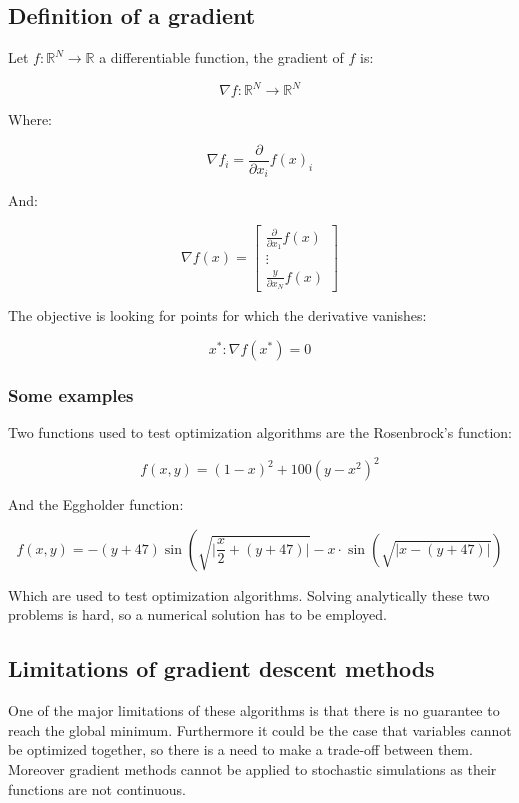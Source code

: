   \subsection{Definition of a gradient}
  Let $f: \mathbb{R}^N \rightarrow \mathbb{R}$ a differentiable function, the gradient of $f$ is:

  $$\nabla f: \mathbb{R}^N \rightarrow \mathbb{R}^N$$

  Where:

  $$\nabla f_i=\frac{\partial}{\partial x_i} f(x)_i$$

  And:

  $$\nabla f(x) =\left[\begin{array}{c}\frac{\partial}{\partial x_1} f(x) \\ \vdots \\ \frac{y}{\partial x_N} f(x)\end{array}\right]$$

  The objective is looking for points for which the derivative vanishes:

  $$x^* : \nabla f(x^*)=0$$

    \subsubsection{Some examples}
    Two functions used to test optimization algorithms are the Rosenbrock's function:

    $$f(x, y)=(1-x)^2+100\left(y-x^2\right)^2$$

    And the Eggholder function:

    $$f(x, y)=-(y+47) \sin \left(\sqrt{\biggr\vert \frac{x}{2}+(y+47)\biggr\vert}-\right. x \cdot \sin \left(\sqrt{| x-(y+47)|}\right)$$

    Which are used to test optimization algorithms.
    Solving analytically these two problems is hard, so a numerical solution has to be employed.

  \subsection{Limitations of gradient descent methods}
  One of the major limitations of these algorithms is that there is no guarantee to reach the global minimum.
  Furthermore it could be the case that variables cannot be optimized together, so there is a need to make a trade-off between them.
  Moreover gradient methods cannot be applied to stochastic simulations as their functions are not continuous.


